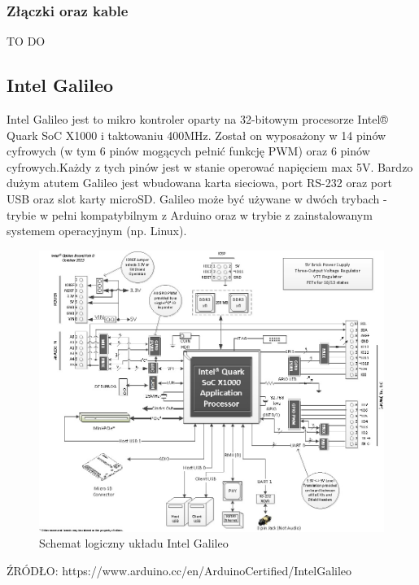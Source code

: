 \documentclass{xmgr}
\begin{document}
\subsubsection{Złączki oraz kable}
TO DO
\subsection{Intel Galileo}
Intel Galileo jest  to mikro kontroler oparty na 32-bitowym procesorze Intel® Quark SoC X1000 i taktowaniu 400MHz. Został on wyposażony w 14 pinów cyfrowych (w tym 6 pinów mogących pełnić funkcję PWM) oraz 6 pinów cyfrowych.Każdy z tych pinów jest w stanie operować napięciem max 5V. Bardzo dużym atutem Galileo jest wbudowana karta sieciowa, port RS-232 oraz port USB oraz slot karty microSD. Galileo może być używane w dwóch trybach - trybie w pełni kompatybilnym z Arduino oraz w trybie z zainstalowanym systemem operacyjnym (np. Linux).

\begin{figure}[!htb]
    \centering
    \includegraphics[height=0.3\textheight]{images/IntelGalileoLogicSchematics.jpg}
    \caption{Schemat logiczny układu Intel Galileo\label{IntelGalileoLogicSchematics}}
\end{figure}

ŹRÓDŁO: https://www.arduino.cc/en/ArduinoCertified/IntelGalileo


\end{document}
